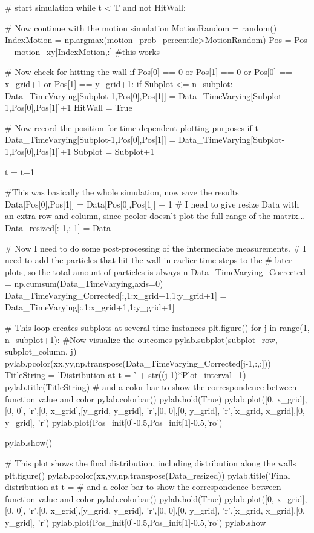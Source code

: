 \begin{python}
    # start simulation
    while t < T and not HitWall:
                
         # Now continue with the motion simulation
        MotionRandom = random()
        IndexMotion = np.argmax(motion_prob_percentile>MotionRandom)
        Pos = Pos + motion_xy[IndexMotion,:] #this works
        
        # Now check for hitting the wall
        if Pos[0] == 0 or Pos[1] == 0 or Pos[0] == x_grid+1 or Pos[1] == y_grid+1:
            if Subplot <= n_subplot:             
                Data_TimeVarying[Subplot-1,Pos[0],Pos[1]] = Data_TimeVarying[Subplot-1,Pos[0],Pos[1]]+1
            HitWall = True

        # Now record the position for time dependent plotting purposes
        if t %
            Data_TimeVarying[Subplot-1,Pos[0],Pos[1]] = Data_TimeVarying[Subplot-1,Pos[0],Pos[1]]+1
            Subplot = Subplot+1        
        
        t = t+1
    
    
    #This was basically the whole simulation, now save the results
    Data[Pos[0],Pos[1]] = Data[Pos[0],Pos[1]] + 1
    # I need to give resize Data with an extra row and column, since pcolor doesn't plot the full range of the matrix...
    Data_resized[:-1,:-1] = Data       


# Now I need to do some post-processing of the intermediate measurements.
# I need to add the particles that hit the wall in earlier time steps to the 
# later plots, so the total amount of particles is always n  
Data_TimeVarying_Corrected = np.cumsum(Data_TimeVarying,axis=0)
Data_TimeVarying_Corrected[:,1:x_grid+1,1:y_grid+1] = Data_TimeVarying[:,1:x_grid+1,1:y_grid+1]


# This loop creates subplots at several time instances
plt.figure()
for j in range(1, n_subplot+1):
    #Now visualize the outcomes
    pylab.subplot(subplot_row, subplot_column, j)
    pylab.pcolor(xx,yy,np.transpose(Data_TimeVarying_Corrected[j-1,:,:]))
    TitleString = 'Distribution at t = ' + str((j-1)*Plot_interval+1)
    pylab.title(TitleString)
    # and a color bar to show the correspondence between function value and color
    pylab.colorbar()
    pylab.hold(True)
    pylab.plot([0, x_grid],[0, 0], 'r',[0, x_grid],[y_grid, y_grid], 'r',[0, 0],[0, y_grid], 'r',[x_grid, x_grid],[0, y_grid], 'r')
    pylab.plot(Pos_init[0]-0.5,Pos_init[1]-0.5,'ro')

pylab.show()

# This plot shows the final distribution, including distribution along the walls
plt.figure()
pylab.pcolor(xx,yy,np.transpose(Data_resized))
pylab.title('Final distribution at t = %
# and a color bar to show the correspondence between function value and color
pylab.colorbar()
pylab.hold(True)
pylab.plot([0, x_grid],[0, 0], 'r',[0, x_grid],[y_grid, y_grid], 'r',[0, 0],[0, y_grid], 'r',[x_grid, x_grid],[0, y_grid], 'r')
pylab.plot(Pos_init[0]-0.5,Pos_init[1]-0.5,'ro')
pylab.show
\end{python}



